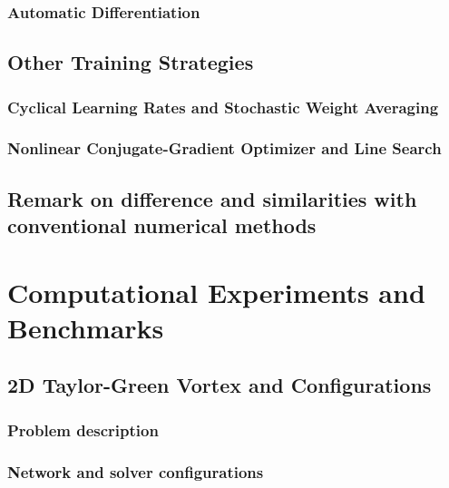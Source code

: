\documentclass[font=STIX2]{gw-dissertation}[2021/11/19]
\begin{document}
        \subsection{Automatic Differentiation}\label{sec:ad}
        

    \section{Other Training Strategies}
    

        \subsection{Cyclical Learning Rates and Stochastic Weight Averaging}\label{sec:cyclic-swa}
        

        \subsection{Nonlinear Conjugate-Gradient Optimizer and Line Search}\label{sec:ncg}
        

    \section{Remark on difference and similarities with conventional numerical methods}\label{sec:pinn-diff}
    

\chapter{Computational Experiments and Benchmarks}\label{chap:pinn-cases}

    \section{2D Taylor-Green Vortex and Configurations}
    

        \subsection{Problem description}
        

        \subsection{Network and solver configurations}
        
\end{document}
